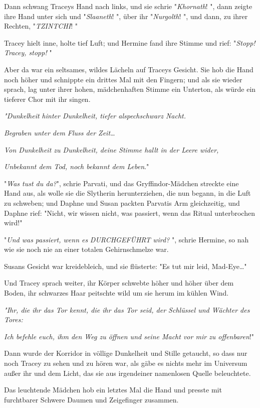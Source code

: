 {Dann schwang Traceys Hand nach links, und sie schrie "\emph{Khornath}! ", dann zeigte ihre Hand unter sich und "\emph{Slaaneth}! ", über ihr "\emph{Nurgolth}! ", und dann, zu ihrer Rechten, "\emph{TZINTCHI}! "

Tracey hielt inne, holte tief Luft; und Hermine fand ihre Stimme und rief: "\emph{Stopp! Tracey, stopp!} "

Aber da war ein seltsames, wildes Lächeln auf Traceys Gesicht. Sie hob die Hand noch höher und schnippte ein drittes Mal mit den Fingern; und als sie wieder sprach, lag unter ihrer hohen, mädchenhaften Stimme ein Unterton, als würde ein tieferer Chor mit ihr singen.

\emph{"\emph{Dunkelheit} \emph{hinter} \emph{Dunkelheit, tiefer alspechschwarz} \emph{Nacht.}}

\emph{\emph{Begraben unter dem Fluss der Zeit…}}

\emph{\emph{Von Dunkelheit zu Dunkelheit, deine Stimme hallt in der Leere wider,}}

\emph{Unbekannt dem Tod, noch bekannt dem Leben}."

"\emph{Was tust du da?}", schrie Parvati, und das Gryffindor-Mädchen streckte eine Hand aus, als wolle sie die Slytherin herunterziehen, die nun begann, in die Luft zu schweben; und Daphne und Susan packten Parvatis Arm gleichzeitig, und Daphne rief: "Nicht, wir wissen nicht, was passiert, wenn das Ritual unterbrochen wird!"

"\emph{Und was passiert, wenn es} \emph{DURCHGEFÜHRT} \emph{wird?} ", schrie Hermine, so nah wie sie noch nie an einer totalen Gehirnschmelze war.

Susans Gesicht war kreidebleich, und sie flüsterte: "Es tut mir leid, Mad-Eye…"

Und Tracey sprach weiter, ihr Körper schwebte höher und höher über dem Boden, ihr schwarzes Haar peitschte wild um sie herum im kühlen Wind.

\emph{"\emph{Ihr, die ihr das Tor kennt, die ihr das Tor seid, der Schlüssel und Wächter des Tores:}}

\emph{Ich befehle euch, ihm den Weg zu öffnen und seine Macht vor mir zu offenbaren}!"

Dann wurde der Korridor in völlige Dunkelheit und Stille getaucht, so dass nur noch Tracey zu sehen und zu hören war, als gäbe es nichts mehr im Universum außer ihr und dem Licht, das sie aus irgendeiner namenlosen Quelle beleuchtete.

Das leuchtende Mädchen hob ein letztes Mal die Hand und presste mit furchtbarer Schwere Daumen und Zeigefinger zusammen.

}
